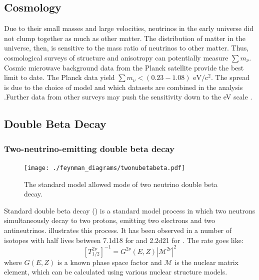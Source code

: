 \documentclass[herrin-thesis.tex]{subfiles}
\begin{document}
\subsection{Cosmology}
Due to their small masses and large velocities, neutrinos in the early universe did not clump together as much as other matter. The distribution of matter in the universe, then, is sensitive to the mass ratio of neutrinos to other matter. Thus, cosmological surveys of structure and anisotropy can potentially measure \(\sum m_{\nu}\). Cosmic microwave background data from the Planck satellite provide the best limit to date. The Planck data yield \(\sum m_{\nu} < (0.23 - 1.08) \text{ eV}/\text{c}^2\). The spread is due to the choice of model and which datasets are combined in the analysis \cite{Ade:2013kl}.Further data from other surveys may push the sensitivity down to the \si{\eV} scale \cite{Abazajian:2011dt}.

\subsection{Double Beta Decay}
\label{sec:nu_doublebetadecay}

\subsubsection{Two-neutrino-emitting double beta decay}

\begin{figure}[htp]
	\centering
	\texttt{[image: ./feynman\_diagrams/twonubetabeta.pdf]}
	\caption[\(2\nu\beta\beta\) decay]{The standard model allowed mode of two neutrino double beta decay.}
	\label{fig:nu_diagram_2nubb}
\end{figure}

Standard double beta decay (\twonu{}) is a standard model process in which two neutrons simultaneously decay to two protons, emitting two electrons and two antineutrinos.  illustrates this process. It has been observed in a number of isotopes with half lives between \SI{7.1d18}{\year} for  \cite{Arnold:2005hc} and \SI{2.2d21}{\year} for  \cite{Auger:2012ar}. The rate goes like:
\begin{equation}
\left [ T^{2\nu}_{1/2} \right ]^{-1} = G^{2\nu}\left(E, Z\right)\left| \mathcal{M}^{2\nu}\right |^2
\label{eq:nu_twonu_rate}
\end{equation}
where \(G(E,Z)\) is a known phase space factor and \(\mathcal{M}\) is the nuclear matrix element, which can be calculated using various nuclear structure models.
\end{document}
